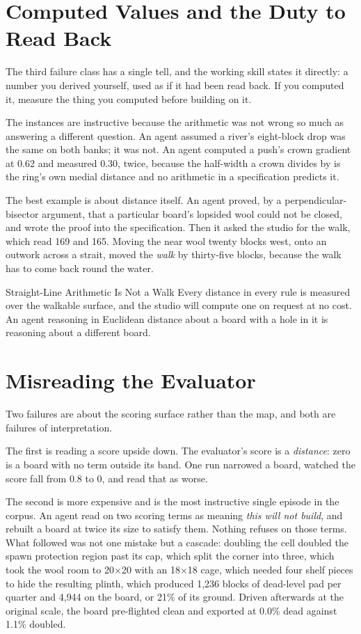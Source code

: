 \section{Computed Values and the Duty to Read Back}

The third failure class has a single tell, and the working skill states it
directly: a number you derived yourself, used as if it had been read back. If you
computed it, measure the thing you computed before building on it.

The instances are instructive because the arithmetic was not wrong so much as
answering a different question. An agent assumed a river's eight-block drop was the
same on both banks; it was not. An agent computed a push's crown gradient at 0.62
and measured 0.30, twice, because the half-width a crown divides by is the ring's
own medial distance and no arithmetic in a specification predicts it.

The best example is about distance itself. An agent proved, by a
perpendicular-bisector argument, that a particular board's lopsided wool could not
be closed, and wrote the proof into the specification. Then it asked the studio for
the walk, which read 169 and 165. Moving the near wool twenty blocks west, onto an
outwork across a strait, moved the \emph{walk} by thirty-five blocks, because the
walk has to come back round the water.

\begin{ruling}{Straight-Line Arithmetic Is Not a Walk}
Every distance in every rule is measured over the walkable surface, and the studio
will compute one on request at no cost. An agent reasoning in Euclidean distance
about a board with a hole in it is reasoning about a different board.
\end{ruling}

\section{Misreading the Evaluator}

Two failures are about the scoring surface rather than the map, and both are
failures of interpretation.

The first is reading a score upside down. The evaluator's score is a
\emph{distance}: zero is a board with no term outside its band. One run narrowed a
board, watched the score fall from 0.8 to 0, and read that as worse.

The second is more expensive and is the most instructive single episode in the
corpus. An agent read  on two scoring terms as meaning
\emph{this will not build}, and rebuilt a board at twice its size to satisfy them.
Nothing refuses on those terms. What followed was not one mistake but a cascade:
doubling the cell doubled the spawn protection region past its cap, which split the
corner into three, which took the wool room to 20$\times$20 with an 18$\times$18
cage, which needed four shelf pieces to hide the resulting plinth, which produced
1{,}236 blocks of dead-level pad per quarter and 4{,}944 on the board, or 21\% of
its ground. Driven afterwards at the original scale, the board pre-flighted clean
and exported at 0.0\% dead against 1.1\% doubled.

